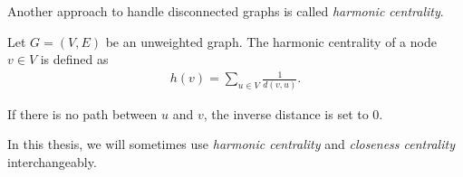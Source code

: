 Another approach to handle disconnected graphs is called \emph{harmonic centrality}.

\begin{definition}
\label{def:harmonicCentrality}
Let $G = (V, E)$ be an unweighted graph. The harmonic centrality of a node $v \in V$ is defined as
\begin{align*}
	h(v) = \sum_{u \in V}{\frac{1}{d(v, u)}}.
\end{align*}
\end{definition}
If there is no path between $u$ and $v$, the inverse distance is set to $0$.

In this thesis, we will sometimes use \emph{harmonic centrality} and \emph{closeness centrality} interchangeably.
